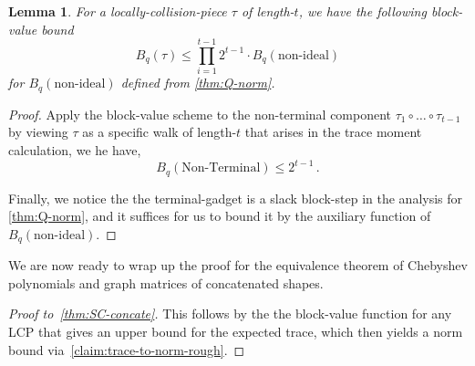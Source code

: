 \documentclass[12pt]{article}
\newtheorem{lemma}[theorem]{Lemma}
\newcommand{\calB}{\mathcal{B}}
\begin{document}

\begin{lemma}
For a locally-collision-piece $\tau$ of length-$t$, we have the following block-value bound   
\[
B_q(\tau) \leq \prod_{i=1}^{t-1} 2^{t-1}  \cdot  B_q(\text{non-ideal}) \]
for $B_q(\text{non-ideal})$ defined from \cref{thm:Q-norm}.
\end{lemma}
\begin{proof}
	


Apply the block-value scheme to the non-terminal component $\tau_1\circ\dots \circ \tau_{t-1}$ by viewing $\tau$ as a specific walk of length-$t$ that arises in the trace moment calculation,  we he have, \[
B_q(\text{Non-Terminal} ) \leq  2^{t-1} \,.
 \]
  
 Finally, we notice the the terminal-gadget is a slack block-step in the analysis for \cref{thm:Q-norm}, and it suffices for us to bound it by the auxiliary function of $B_q(\text{non-ideal})$. 
\end{proof}
 
We are now ready to wrap up the proof for the equivalence theorem of Chebyshev polynomials and graph matrices of concatenated shapes.
\begin{proof}[Proof to~\cref{thm:SC-concate}]
	This follows by the the block-value function for any LCP that gives an upper bound for the expected trace, which then yields a norm bound via~\cref{claim:trace-to-norm-rough}.
\end{proof}
 
\end{document}
